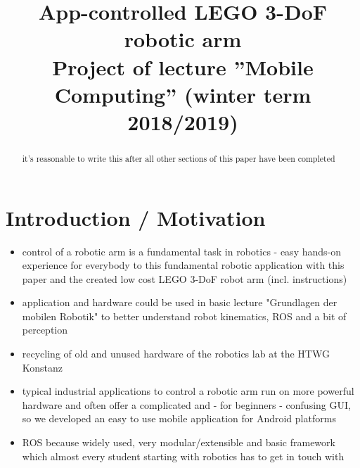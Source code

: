 \documentclass[conference]{IEEEtran}
\begin{document}
\title{App-controlled LEGO 3-DoF robotic arm\\
{\footnotesize Project of lecture ''Mobile Computing'' (winter term 2018/2019)}
}

\author{
\and
{}
}

\maketitle

\begin{abstract}
it's reasonable to write this after all other sections of this paper have been completed
\end{abstract}


\section{Introduction / Motivation}
\begin{itemize}
	\item control of a robotic arm is a fundamental task in robotics - easy hands-on experience for everybody to this fundamental robotic application with this paper and the created low cost LEGO 3-DoF robot arm  (incl. instructions)
	\item application and hardware could be used in basic lecture "Grundlagen der mobilen Robotik" to better understand robot kinematics, ROS and a bit of perception
	\item recycling of old and unused hardware of the robotics lab at the HTWG Konstanz
	\item typical industrial applications to control a robotic arm run on more powerful hardware and often offer a complicated and - for beginners - confusing GUI,  so we developed an easy to use mobile application for Android platforms
	\item ROS because widely used, very modular/extensible and basic framework which almost every student starting with robotics has to get in touch with
\end{itemize}
\par
\end{document}
